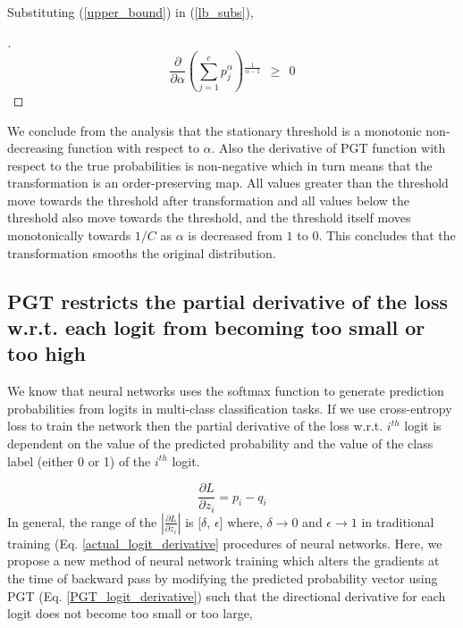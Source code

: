 \documentclass[times,sort&compress]{elsarticle}
\begin{document}
Substituting (\ref{upper_bound}) in (\ref{lb_subs}),

\begin{proof}[\unskip\nopunct] \begin{equation} \frac{\partial}{\partial \alpha
}\left(\sum _{j=1}^c p_j^{\alpha}\right){}^{\frac{1}{\alpha -1}}\ \ \geq \ \ 0
\end{equation} \end{proof}



We conclude from the analysis that the stationary threshold is a monotonic
non-decreasing function with respect to $\alpha$. Also the derivative of PGT function
with respect to the true probabilities is non-negative which in turn means that the
transformation is an order-preserving map. All values greater than the threshold move
towards the threshold after transformation and all values below the threshold also move
towards the threshold, and the threshold itself moves monotonically towards $1/C$ as
$\alpha$ is decreased from $1$ to $0$. This concludes that the transformation smooths
the original distribution.









\subsection{PGT restricts the partial derivative of the loss w.r.t. each logit from becoming too small or too high}
\label{sec:pgt_logit_derivative}

We know that neural networks uses the softmax function to generate prediction
probabilities from logits in multi-class classification tasks. If we use cross-entropy
loss to train the network then the partial derivative of the loss w.r.t. $i^{th}$ logit
is dependent on the value of the predicted probability and the value of the class label
(either 0 or 1) of the $i^{th}$ logit. 

\begin{equation}
\label{actual_logit_derivative}
\frac{\partial L}{\partial z_i} = p_i -q_i
\end{equation}
In general, the range of the $|\frac{\partial L}{\partial z_i}|$ is [$\delta$,
$\epsilon$] where, $\delta\rightarrow 0$ and $\epsilon\rightarrow 1$ in traditional
training (Eq. \ref{actual_logit_derivative} procedures of neural networks. Here, we
propose a new method of neural network training which alters the gradients at the time
of backward pass by modifying the predicted probability vector using PGT (Eq.
\ref{PGT_logit_derivative}) such that the directional derivative for each logit does not
become too small or too large,
\end{document}
